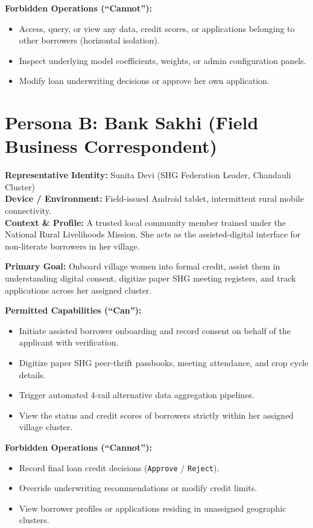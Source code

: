 \documentclass[11pt,a4paper,oneside]{report}
\begin{document}
\noindent\textbf{Forbidden Operations (``Cannot''):}
\begin{itemize}[leftmargin=1.5em, itemsep=1pt]
  \item Access, query, or view any data, credit scores, or applications belonging to other borrowers (horizontal isolation).
  \item Inspect underlying model coefficients, weights, or admin configuration panels.
  \item Modify loan underwriting decisions or approve her own application.
\end{itemize}

\section{Persona B: Bank Sakhi (Field Business Correspondent)}
\noindent\textbf{Representative Identity:} Sunita Devi (SHG Federation Leader, Chandauli Cluster)\\
\textbf{Device / Environment:} Field-issued Android tablet, intermittent rural mobile connectivity.\\
\textbf{Context \& Profile:} A trusted local community member trained under the National Rural Livelihoods Mission. She acts as the assisted-digital interface for non-literate borrowers in her village.

\vspace{0.2cm}
\noindent\textbf{Primary Goal:} Onboard village women into formal credit, assist them in understanding digital consent, digitize paper SHG meeting registers, and track applications across her assigned cluster.

\vspace{0.2cm}
\noindent\textbf{Permitted Capabilities (``Can''):}
\begin{itemize}[leftmargin=1.5em, itemsep=1pt]
  \item Initiate assisted borrower onboarding and record consent on behalf of the applicant with verification.
  \item Digitize paper SHG peer-thrift passbooks, meeting attendance, and crop cycle details.
  \item Trigger automated 4-rail alternative data aggregation pipelines.
  \item View the status and credit scores of borrowers strictly within her assigned village cluster.
\end{itemize}

\noindent\textbf{Forbidden Operations (``Cannot''):}
\begin{itemize}[leftmargin=1.5em, itemsep=1pt]
  \item Record final loan credit decisions (\texttt{Approve} / \texttt{Reject}).
  \item Override underwriting recommendations or modify credit limits.
  \item View borrower profiles or applications residing in unassigned geographic clusters.
\end{itemize}
\end{document}
